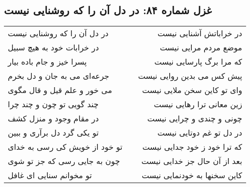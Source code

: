 \begin{center}
\section*{غزل شماره ۸۴: در دل آن را که روشنایی نیست}
\label{sec:084}
\begin{longtable}{l p{0.5cm} r}
در دل آن را که روشنایی نیست
&&
در خراباتش آشنایی نیست
\\
در خرابات خود به هیچ سبیل
&&
موضع مردم مرایی نیست
\\
پسرا خیز و جام باده بیار
&&
که مرا برگ پارسایی نیست
\\
جرعه‌ای می به جان و دل بخرم
&&
پیش کس می بدین روایی نیست
\\
می خور و علم قیل و قال مگوی
&&
وای تو کاین سخن ملایی نیست
\\
چند گویی تو چون و چند چرا
&&
زین معانی ترا رهایی نیست
\\
در مقام وجود و منزل کشف
&&
چونی و چندی و چرایی نیست
\\
تو یکی گرد دل برآری و ببین
&&
در دل تو غم دوتایی نیست
\\
تو خود از خویش کی رسی به خدای
&&
که ترا خود ز خود جدایی نیست
\\
چون به جایی رسی که جز تو شوی
&&
بعد از آن حال جز خدایی نیست
\\
تو مخوانم سنایی ای غافل
&&
کاین سخنها به خودنمایی نیست
\\
\end{longtable}
\end{center}
